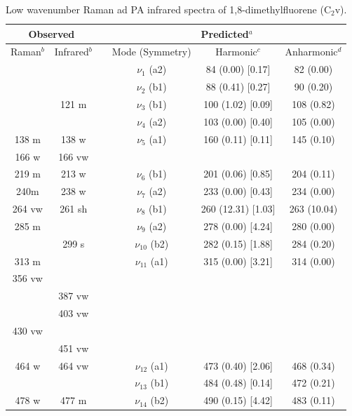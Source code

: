 \begin{table}[H]
	\caption{Low wavenumber Raman ad PA infrared spectra of 1,8-dimethylfluorene (C$_{2}$v).}
	\begin{center}
		\begin{threeparttable}
		\begin{tabular}{c c c c c c}
			\hline
			\multicolumn{ 2}{c}{Observed} & \multicolumn{1}{c}{} & \multicolumn{ 3}{c}{Predicted$^{a}$} \\ \hline
			Raman$^{b}$ & \multicolumn{1}{c}{Infrared$^{b}$} &  & \multicolumn{1}{c}{Mode (Symmetry)} & \multicolumn{1}{c}{Harmonic$^{c}$} & Anharmonic$^{d}$ \\ \hline
\multicolumn{1}{c}{} &  &  & $\nu_{1}$ (a2) & 84 (0.00) [0.17] & 82 (0.00) \\ 
&  &  & $\nu_{2}$ (b1) & 88 (0.41) [0.27] & 90 (0.20) \\ 
& 121 m &  & $\nu_{3}$ (b1) & 100 (1.02) [0.09] & 108 (0.82) \\ 
&  &  & $\nu_{4}$ (a2) & 103 (0.00) [0.40] & 105 (0.00) \\ 
138 m & 138 w &  & $\nu_{5}$ (a1) & 160 (0.11) [0.11] & 145 (0.10) \\ 
166 w & 166 vw &  &  &  &  \\ 
219 m & 213 w &  & $\nu_{6}$ (b1) & 201 (0.06) [0.85] & 204 (0.11) \\ 
240m & 238 w &  & $\nu_{7}$ (a2) & 233 (0.00) [0.43] & 234 (0.00) \\ 
264 vw & 261 sh &  & $\nu_{8}$ (b1) & 260 (12.31) [1.03] & 263 (10.04) \\ 
285 m &  &  & $\nu_{9}$ (a2) & 278 (0.00) [4.24] & 280 (0.00) \\ 
& 299 s &  & $\nu_{10}$ (b2)
& 282 (0.15) [1.88] & 284 (0.20) \\ 
313 m &  &  & $\nu_{11}$ (a1) & 315 (0.00) [3.21] & 314 (0.00) \\ 
356 vw &  &  &  &  &  \\ 
& 387 vw &  &  &  &  \\ 
& 403 vw &  &  &  & \multicolumn{1}{l}{} \\ 
430 vw &  &  & \multicolumn{1}{c}{} &  &  \\ 
& 451 vw &  &  &  & \multicolumn{1}{l}{} \\ 
464 w & 464 vw &  & $\nu_{12}$ (a1) & 473 (0.40) [2.06] & 468 (0.34) \\ 
&  &  & $\nu_{13}$ (b1) & 484 (0.48) [0.14] & 472 (0.21) \\ 
478 w & 477 m &  & $\nu_{14}$ (b2) & 490 (0.15) [4.42] & 483 (0.11) \\ 

\end{tabular}
\end{threeparttable}
\end{center}
\end{table}
